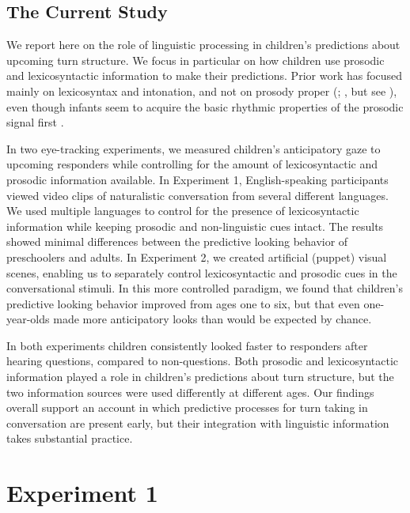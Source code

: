 \documentclass[authoryear, 12pt]{elsarticle}
\begin{document}
\subsection{The Current Study}
We report here on the role of linguistic processing in children's predictions about upcoming turn structure. We focus in particular on how children use prosodic and lexicosyntactic information to make their predictions. Prior work has focused mainly on lexicosyntax and intonation, and not on prosody proper (\citealp{de-ruiter2006}; \citealp{keitel2013}, but see \citealp{torreira2015}), even though infants seem to acquire the basic rhythmic properties of the prosodic signal first \citep{mehler1988, moon1993, nazzi2003}.

In two eye-tracking experiments, we measured children's anticipatory gaze to upcoming responders while controlling for the amount of lexicosyntactic and prosodic information available. In Experiment 1, English-speaking participants viewed video clips of naturalistic conversation from several different languages. We used multiple languages to control for the presence of lexicosyntactic information while keeping prosodic and non-linguistic cues intact. The results showed minimal differences between the predictive looking behavior of preschoolers and adults. In Experiment 2, we created artificial (puppet) visual scenes, enabling us to separately control lexicosyntactic and prosodic cues in the conversational stimuli. In this more controlled paradigm, we found that children's predictive looking behavior improved from ages one to six, but that even one-year-olds made more anticipatory looks than would be expected by chance. 

In both experiments children consistently looked faster to responders after hearing questions, compared to non-questions. Both prosodic and lexicosyntactic information played a role in children's predictions about turn structure, but the two information sources were used differently at different ages. Our findings overall support an account in which predictive processes for turn taking in conversation are present early, but their integration with linguistic information takes substantial practice. 

\section{Experiment 1}
\label{sec:exp1}
\end{document}
